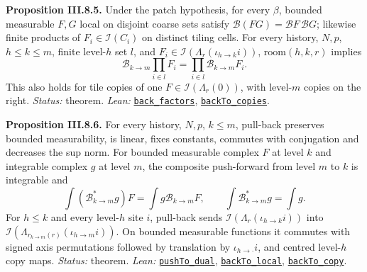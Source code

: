 \documentclass[
  letterpaper,
  11pt]{article}
\begin{document}
\textbf{Proposition III.8.5.} Under the patch hypothesis, for every
\(\beta\), bounded measurable \(F,G\) local on disjoint coarse sets
satisfy \(\mathcal B(FG)=\mathcal BF\,\mathcal BG\); likewise finite
products of \(F_i\in\mathcal I(C_i)\) on distinct tiling cells. For
every history, \(N,p\), \(h\le k\le m\), finite level-\(h\) set \(l\),
and \(F_i\in\mathcal I(\Lambda_r(\iota_{h\to k}i))\),
\(\mathrm{room}(h,k,r)\) implies
\[\mathcal B_{k\to m}\prod_{i\in l}F_i=\prod_{i\in l}\mathcal B_{k\to m}F_i.\]
This also holds for tile copies of one \(F\in\mathcal I(\Lambda_r(0))\),
with level-\(m\) copies on the right. \emph{Status:} theorem.
\emph{Lean:}
\href{https://github.com/yang-mills-group/OpenAI-YM-20261028/blob/3456e5e75cf8d4cd558955a5c7638fba2d68f464/YM/Push/GRID_APPROXIMATION/KernelLocal.lean\#L141-L150}{\texttt{back\_factors}},
\href{https://github.com/yang-mills-group/OpenAI-YM-20261028/blob/3456e5e75cf8d4cd558955a5c7638fba2d68f464/YM/Push/GRID_APPROXIMATION/Many.lean\#L68-L76}{\texttt{backTo\_copies}}.

\textbf{Proposition III.8.6.} For every history, \(N,p\), \(k\le m\),
pull-back preserves bounded measurability, is linear, fixes constants,
commutes with conjugation and decreases the sup norm. For bounded
measurable complex \(F\) at level \(k\) and integrable complex \(g\) at
level \(m\), the composite push-forward from level \(m\) to \(k\) is
integrable and
\[\int(\mathcal B^*_{k\to m}g)F=\int g\mathcal B_{k\to m}F,\qquad\int\mathcal B^*_{k\to m}g=\int g.\]
For \(h\le k\) and every level-\(h\) site \(i\), pull-back sends
\(\mathcal I(\Lambda_r(\iota_{h\to k}i))\) into
\(\mathcal I(\Lambda_{r_{k\to m}(r)}(\iota_{h\to m}i))\). On bounded
measurable functions it commutes with signed axis permutations followed
by translation by \(\iota_{h\to\cdot}i\), and centred level-\(h\) copy
maps. \emph{Status:} theorem. \emph{Lean:}
\href{https://github.com/yang-mills-group/OpenAI-YM-20261028/blob/3456e5e75cf8d4cd558955a5c7638fba2d68f464/YM/Push/GRID_APPROXIMATION/Iterate.lean\#L92-L101}{\texttt{pushTo\_dual}},
\href{https://github.com/yang-mills-group/OpenAI-YM-20261028/blob/3456e5e75cf8d4cd558955a5c7638fba2d68f464/YM/Push/GRID_APPROXIMATION/Iterate.lean\#L105-L115}{\texttt{backTo\_local}},
\href{https://github.com/yang-mills-group/OpenAI-YM-20261028/blob/3456e5e75cf8d4cd558955a5c7638fba2d68f464/YM/Push/GRID_APPROXIMATION/Iterate.lean\#L128-L147}{\texttt{backTo\_copy}}.
\end{document}
